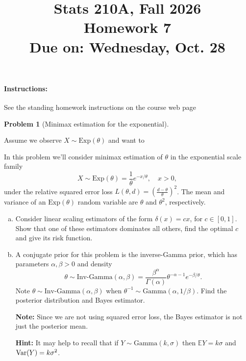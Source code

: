 \documentclass{article}
\newcommand{\EE}{\mathbb{E}}
\newcommand{\Var}{\textnormal{Var}}
\theoremstyle{definition}
\newtheorem{problem}{Problem}
\begin{document}
\title{Stats 210A, Fall 2026\\
  Homework 7 \\
  {\large {\bf Due on}: Wednesday, Oct. 28}}
\date{}

\maketitle

\paragraph{Instructions:} See the standing homework instructions on the course web page


\begin{problem}[Minimax estimation for the exponential]
\label{prob:minimax-exp}



Assume we observe $X\sim \text{Exp}(\theta)$ and want to 

In this problem we'll consider minimax estimation of $\theta$ in the exponential scale family
\[
X \sim \text{Exp}(\theta) = \frac{1}{\theta}e^{-x/\theta}, \quad x>0,
\]
under the relative squared error loss $L(\theta, d) = \left(\frac{d-\theta}{\theta}\right)^2$. The mean and variance of an $\text{Exp}(\theta)$ random variable are $\theta$ and $\theta^2$, respectively.

\begin{enumerate}[(a)]

\item Consider linear scaling estimators of the form $\delta(x) = cx$, for $c\in[0,1]$. Show that one of these estimators dominates all others, find the optimal $c$ and give its risk function.




\item A conjugate prior for this problem is the inverse-Gamma prior, which has parameters $\alpha,\beta>0$ and density
\[
\theta \sim \text{Inv-Gamma}(\alpha,\beta) = \frac{\beta^\alpha}{\Gamma(\alpha)} \theta^{-\alpha-1}e^{-\beta/\theta}.
\]
Note $\theta\sim \text{Inv-Gamma}(\alpha,\beta)$ when $\theta^{-1}\sim \text{Gamma}(\alpha,1/\beta)$. Find the posterior distribution and Bayes estimator.

{\bf Note:} Since we are not using squared error loss, the Bayes estimator is not just the posterior mean.

{\bf Hint:} It may help to recall that if $Y \sim\text{Gamma}(k,\sigma)$ then $\EE Y = k\sigma$ and $\Var(Y)=k\sigma^2$.




\end{enumerate}
\end{problem}
\end{document}

